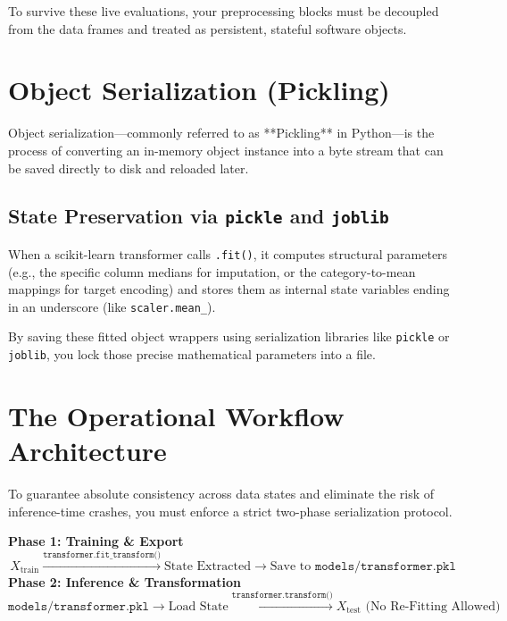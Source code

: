 \documentclass{article}
\begin{document}
To survive these live evaluations, your preprocessing blocks must be decoupled from the data frames and treated as persistent, stateful software objects.

\section{Object Serialization (Pickling)}
Object serialization—commonly referred to as **Pickling** in Python—is the process of converting an in-memory object instance into a byte stream that can be saved directly to disk and reloaded later.

\subsection{State Preservation via \texttt{pickle} and \texttt{joblib}}
When a scikit-learn transformer calls \texttt{.fit()}, it computes structural parameters (e.g., the specific column medians for imputation, or the category-to-mean mappings for target encoding) and stores them as internal state variables ending in an underscore (like \texttt{scaler.mean\_}).

By saving these fitted object wrappers using serialization libraries like \texttt{pickle} or \texttt{joblib}, you lock those precise mathematical parameters into a file.

\section{The Operational Workflow Architecture}
To guarantee absolute consistency across data states and eliminate the risk of inference-time crashes, you must enforce a strict two-phase serialization protocol.

\begin{tcolorbox}[colback=blue!5!white,colframe=blue!70!black,title=The Pipeline Serialization Pattern]
\textbf{Phase 1: Training \& Export}
\begin{equation}
    X_{\text{train}} \xrightarrow{\texttt{transformer.fit\_transform()}} \text{State Extracted} \longrightarrow \text{Save to } \texttt{models/transformer.pkl}
\end{equation}
\textbf{Phase 2: Inference \& Transformation}
\begin{equation}
    \texttt{models/transformer.pkl} \longrightarrow \text{Load State} \xrightarrow{\texttt{transformer.transform()}} X_{\text{test}} \text{ (No Re-Fitting Allowed)}
\end{equation}
\end{tcolorbox}
\end{document}
